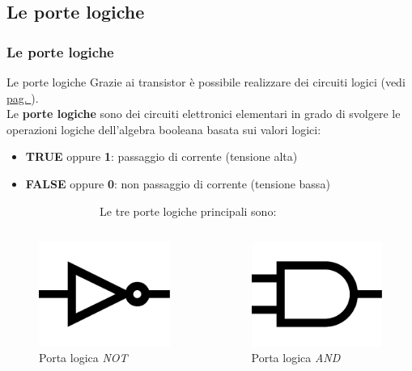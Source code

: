 \subsection[Le porte logiche]{Le porte logiche}
\begin{frame}
	\frametitle{Le porte logiche}
	
	\begin{block}{Le porte logiche}
		Grazie ai transistor è possibile realizzare dei circuiti logici (vedi \hyperlink{fig:architectures_transistors}{pag. \pageref{fig:architectures_transistors}}).\\
		Le \textbf{porte logiche} sono dei circuiti elettronici elementari in grado di svolgere le operazioni logiche dell'algebra booleana basata sui valori logici:
		\begin{itemize}
			\item \textbf{TRUE} oppure \textbf{1}: passaggio di corrente (tensione alta)
			\item \textbf{FALSE} oppure \textbf{0}: non passaggio di corrente (tensione bassa)
		\end{itemize}
	\end{block}
	$\qquad\qquad\qquad\qquad\:$Le tre porte logiche principali sono:
	
	\begin{columns}
		\begin{figure}[!htbp]
			\centering 
			\includegraphics[width=0.5\linewidth]{images/2_le_architetture/logic_gate_not.pdf}
			\caption{Porta logica \textit{NOT}}
		\end{figure}
		
		\begin{figure}[!htbp]
			\centering 
			\includegraphics[width=0.5\linewidth]{images/2_le_architetture/logic_gate_and.pdf}
			\caption{Porta logica \textit{AND}}
		\end{figure} 
		

\end{columns}
\end{frame}
